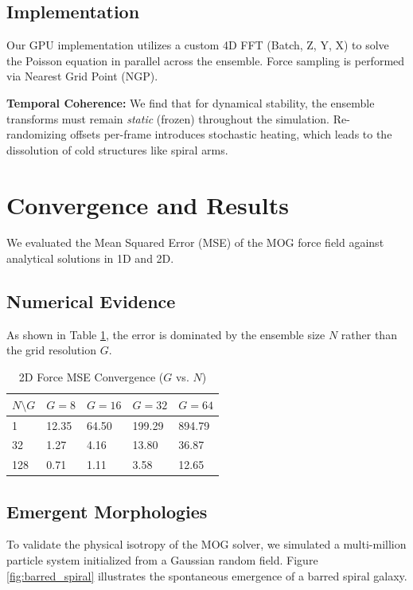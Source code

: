 \documentclass[twocolumn]{article}
\begin{document}
\subsection{Implementation}
Our GPU implementation utilizes a custom 4D FFT (Batch, Z, Y, X) to solve the Poisson equation in parallel across the ensemble. Force sampling is performed via Nearest Grid Point (NGP). 

\textbf{Temporal Coherence:} We find that for dynamical stability, the ensemble transforms must remain \textit{static} (frozen) throughout the simulation. Re-randomizing offsets per-frame introduces stochastic heating, which leads to the dissolution of cold structures like spiral arms.

\section{Convergence and Results}
We evaluated the Mean Squared Error (MSE) of the MOG force field against analytical solutions in 1D and 2D. 

\subsection{Numerical Evidence}
As shown in Table \ref{tab:mse_results}, the error is dominated by the ensemble size $N$ rather than the grid resolution $G$.

\begin{table}[h]
	\centering
	\caption{2D Force MSE Convergence ($G$ vs. $N$)}
	\label{tab:mse_results}
	\begin{tabular}{@{}lllll@{}}
		\toprule
		$N \setminus G$ & $G=8$ & $G=16$ & $G=32$ & $G=64$ \\ \midrule
		1               & 12.35 & 64.50  & 199.29 & 894.79 \\
		32              & 1.27  & 4.16   & 13.80  & 36.87  \\
		128             & 0.71  & 1.11   & 3.58   & 12.65  \\ \bottomrule
	\end{tabular}
\end{table}

\subsection{Emergent Morphologies}
To validate the physical isotropy of the MOG solver, we simulated a multi-million particle system initialized from a Gaussian random field. Figure \ref{fig:barred_spiral} illustrates the spontaneous emergence of a barred spiral galaxy.
\end{document}
